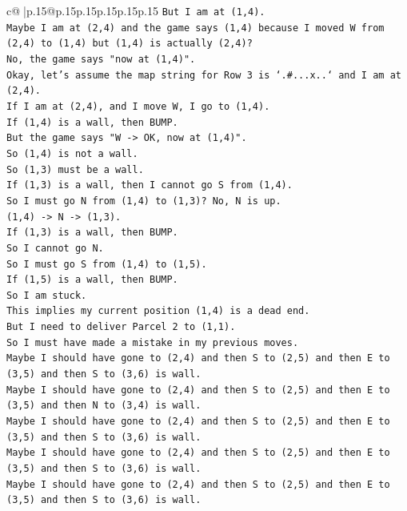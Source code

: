 \documentclass{article}
\begin{document}
{\begin{supertabular}{c@{$\;$}|p{.15\linewidth}@{}p{.15\linewidth}p{.15\linewidth}p{.15\linewidth}p{.15\linewidth}p{.15\linewidth}}
{{{\texttt{But I am at (1,4).} \\
\texttt{Maybe I am at (2,4) and the game says (1,4) because I moved W from (2,4) to (1,4) but (1,4) is actually (2,4)?} \\
\texttt{No, the game says "now at (1,4)".} \\
\texttt{Okay, let's assume the map string for Row 3 is `.\#...x..` and I am at (2,4).} \\
\texttt{If I am at (2,4), and I move W, I go to (1,4).} \\
\texttt{If (1,4) is a wall, then BUMP.} \\
\texttt{But the game says "W {-}> OK, now at (1,4)".} \\
\texttt{So (1,4) is not a wall.} \\
\texttt{So (1,3) must be a wall.} \\
\texttt{If (1,3) is a wall, then I cannot go S from (1,4).} \\
\texttt{So I must go N from (1,4) to (1,3)? No, N is up.} \\
\texttt{(1,4) {-}> N {-}> (1,3).} \\
\texttt{If (1,3) is a wall, then BUMP.} \\
\texttt{So I cannot go N.} \\
\texttt{So I must go S from (1,4) to (1,5).} \\
\texttt{If (1,5) is a wall, then BUMP.} \\
\texttt{So I am stuck.} \\
\texttt{This implies my current position (1,4) is a dead end.} \\
\texttt{But I need to deliver Parcel 2 to (1,1).} \\
\texttt{So I must have made a mistake in my previous moves.} \\
\texttt{Maybe I should have gone to (2,4) and then S to (2,5) and then E to (3,5) and then S to (3,6) is wall.} \\
\texttt{Maybe I should have gone to (2,4) and then S to (2,5) and then E to (3,5) and then N to (3,4) is wall.} \\
\texttt{Maybe I should have gone to (2,4) and then S to (2,5) and then E to (3,5) and then S to (3,6) is wall.} \\
\texttt{Maybe I should have gone to (2,4) and then S to (2,5) and then E to (3,5) and then S to (3,6) is wall.} \\
\texttt{Maybe I should have gone to (2,4) and then S to (2,5) and then E to (3,5) and then S to (3,6) is wall.} \\
}}}
\end{supertabular}}
\end{document}
